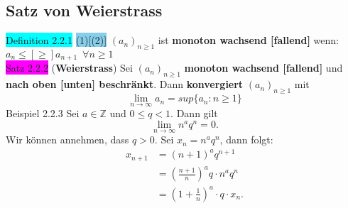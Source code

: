 \documentclass[landscape, 10pt]{article}
\begin{document}
\begin{multicols}{3}
       \subsection{Satz von Weierstrass}
              \colorbox{cyan}{Definition 2.2.1} 
                     \colorbox{SkyBlue}{(1)[(2)]} 
                     $(a_n)_{n\geqslant 1}$ ist \textbf{monoton
                     wachsend [fallend]} wenn: \textcolor{NavyBlue}{
                     $a_n\leqslant[\geqslant]a_{n+1}\enspace\forall n\geqslant1$}\\
              \colorbox{magenta}{Satz 2.2.2} 
              (\textbf{Weierstrass}) 
                     Sei \textcolor{NavyBlue}{$(a_n)_{n\geqslant 1}$}
                     \textbf{monoton wachsend 
                     [fallend]} und \textbf{nach oben [unten] beschränkt}. Dann 
                     \textbf{konvergiert} 
                     \textcolor{NavyBlue}{$(a_n)_{n\geqslant 1}$} mit 
                     \begin{equation*}
                            \lim\limits_{n\to\infty}a_n=sup\{a_n:n\geqslant 1\}
                     \end{equation*}
                     \begin{equation*}
                            [\lim\limits_{n\to\infty}a_n=inf\{a_n:n\geqslant 1\}]
                     \end{equation*}
              \colorbox{Dandelion}{Beispiel 2.2.3} 
                     Sei \textcolor{NavyBlue}{$a\in\mathbb{Z}$} und 
                     \textcolor{NavyBlue}{$0\leqslant q<1$}.
                     Dann gilt 
                     \begin{equation*}
                            \lim\limits_{n\to\infty}n^aq^n=0.
                     \end{equation*}
                     Wir können annehmen, dass 
                     \textcolor{NavyBlue}{$q>0$}. Sei 
                     \textcolor{NavyBlue}{$x_n=n^aq^n$}, 
                     dann folgt:
                     \begin{align*}
                            x_{n+1}&=(n+1)^aq^{n+1}\\
                                   &=(\frac{n+1}{n})^aq\cdot n^aq^n\\
                                   &=(1+\frac{1}{n})^a\cdot q\cdot x_n.
                     \end{align*}

\end{multicols}
\end{document}
